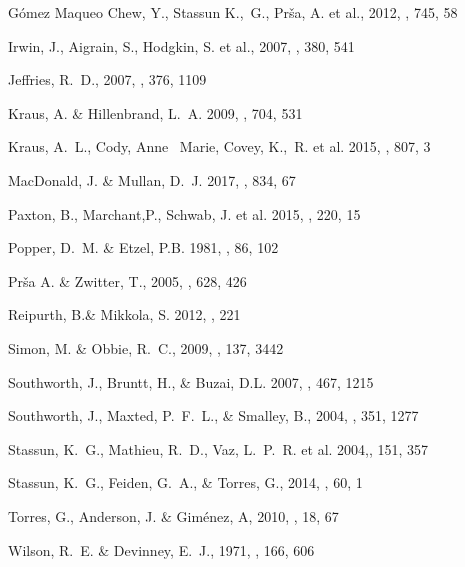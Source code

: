 \documentclass[12pt,preprint]{aastex6}
\begin{document}
{\begin{thebibliography}{}
 G\'omez Maqueo 
Chew, Y., Stassun K.,~G., Pr{\v s}a, A. et al., 2012, \apj, 745, 58


 Irwin, J., Aigrain, S., 
Hodgkin, S. et al., 2007, \mnras, 380, 541

 Jeffries, R.~D., 2007, \mnras,
376, 1109

 Kraus, A. \& 
Hillenbrand, L.~A. 2009, \apj, 704, 531

 Kraus, A.~L., Cody, Anne~
Marie, Covey, K.,~R. et al. 2015, \apj, 807, 3


 MacDonald, J. 
\& Mullan, D.~J. 2017, \apj, 834, 67

 Paxton, B., Marchant,P.,
Schwab, J. et al. 2015, \apjs, 220, 15 


 Popper, D.~M. \&
Etzel, P.B. 1981, \aj, 86, 102 

 Pr{\v s}a A. \&
Zwitter, T., 2005, \apj, 628, 426 

 Reipurth, B.\&
Mikkola, S. 2012, , 221

 Simon, M. \& Obbie, R.~C.,
2009, \aj, 137, 3442

 Southworth, J., Bruntt, H., \& Buzai, D.L. 2007, \aap, 467, 1215 

Southworth, J., 
Maxted, P.~F.~L., \& Smalley, B., 2004, \mnras, 351, 1277

 Stassun, K.~G., 
Mathieu, R.~D., Vaz, L.~P.~R. et al. 2004,\apjs, 151, 357

 Stassun, K.~G., 
Feiden, G.~A., \& Torres, G., 2014, \nar, 60, 1

 Torres, G., Anderson, J. \&
Gim\'enez, A, 2010, \aapr, 18, 67

 Wilson, R.~E. \&
Devinney, E.~J., 1971, \apj, 166, 606


\end{thebibliography}}
\end{document}
